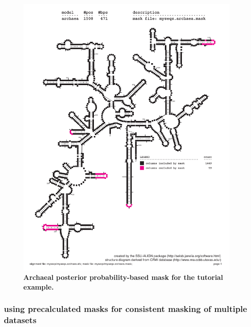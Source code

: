 \begin{figure}
  \begin{center}
\includegraphics[width=6.5in]{Figures/myseqs-archaea-mask}
\textbf{Archaeal posterior probability-based mask for the tutorial example.}
  \end{center}
\label{fig:myseqs-archaea-mask}
\end{figure}

\subsubsection{using precalculated masks for consistent masking of
  multiple datasets}

